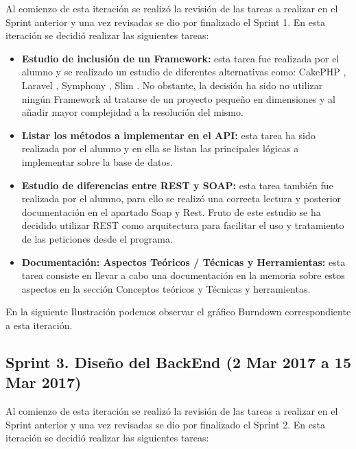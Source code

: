 Al comienzo de esta iteración se realizó la revisión de las tareas a realizar en el Sprint anterior y una vez revisadas se dio por finalizado el Sprint 1. 
En esta iteración se decidió realizar las siguientes tareas:

\begin{itemize}
	
	\item \textbf{Estudio de inclusión de un Framework:} esta tarea fue realizada por el alumno y se realizado un estudio de diferentes alternativas como: CakePHP \cite{wiki:cakephp}, Laravel \cite{wiki:laravel}, Symphony \cite{wiki:symphony}, Slim \cite{wiki:slim}. No obstante, la decisión ha sido no utilizar ningún Framework al tratarse de un proyecto pequeño en dimensiones y al añadir mayor complejidad a la resolución del mismo.
	
	\item \textbf{Listar los métodos a implementar en el API:} esta tarea ha sido realizada por el alumno y en ella se listan las principales lógicas a implementar sobre la base de datos.
	
	\item \textbf{Estudio de diferencias entre REST y SOAP:} esta tarea también fue realizada por el alumno, para ello se realizó una correcta lectura y posterior documentación en el apartado Soap y Rest. Fruto de este estudio se ha decidido utilizar REST como arquitectura para facilitar el uso y tratamiento de las peticiones desde el programa.
	
	\item \textbf{Documentación: Aspectos Teóricos / Técnicas y Herramientas:} esta tarea consiste en llevar a cabo una documentación en la memoria sobre estos aspectos en la sección Conceptos teóricos y Técnicas y herramientas.


\end{itemize}

En la siguiente Ilustración podemos observar el gráfico Burndown correspondiente a esta iteración.


\subsection{Sprint 3. Diseño del BackEnd (2 Mar 2017 a 15 Mar 2017)}

Al comienzo de esta iteración se realizó la revisión de las tareas a realizar en el Sprint anterior y una vez revisadas se dio por finalizado el Sprint 2. 
En esta iteración se decidió realizar las siguientes tareas:

